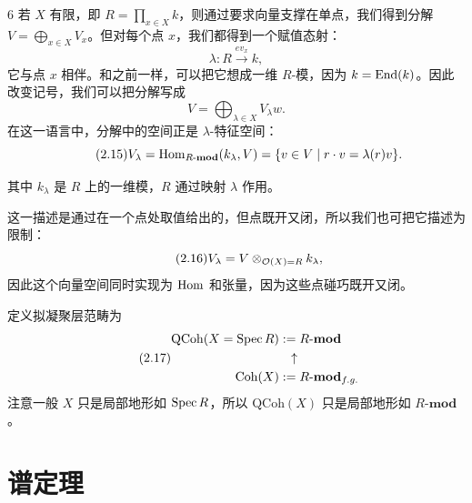 \begin{srcex}{6}
若 $X$ 有限，即 $R=\prod_{x\in X}k$，则通过要求向量支撑在单点，我们得到分解 $V=\bigoplus_{x\in X}V_x$。但对每个点 $x$，我们都得到一个赋值态射：
\begin{equation}\tag{2.13}
\lambda\colon R\xrightarrow{ev_x}k,
\end{equation}
它与点 $x$ 相伴。和之前一样，可以把它想成一维 $R$-模，因为 $k=\mathrm{End}(k)$。因此改变记号，我们可以把分解写成
\begin{equation}\tag{2.14}
V=\bigoplus_{\lambda\in X}V_\lambda w.
\end{equation}
在这一语言中，分解中的空间正是 $\lambda$-特征空间：
\begin{equation}\tag{2.15}
V_\lambda=\mathrm{Hom}_{R\text{-}\mathbf{mod}}(k_\lambda,V)
=\{v\in V\mid r\cdot v=\lambda(r)v\}.
\end{equation}
\end{srcex}

其中 $k_\lambda$ 是 $R$ 上的一维模，$R$ 通过映射 $\lambda$ 作用。

这一描述是通过在一个点处取值给出的，但点既开又闭，所以我们也可把它描述为限制：
\begin{equation}\tag{2.16}
V_\lambda=V\otimes_{\mathcal{O}(X)=R}k_\lambda,
\end{equation}
因此这个向量空间同时实现为 $\mathrm{Hom}$ 和张量，因为这些点碰巧既开又闭。

定义拟凝聚层范畴为
\begin{equation}\tag{2.17}
\begin{aligned}
\mathrm{QCoh}(X=\mathrm{Spec}\,R) &:= R\text{-}\mathbf{mod}\\
&\ \ \uparrow\\
\mathrm{Coh}(X) &:= R\text{-}\mathbf{mod}_{f.g.}
\end{aligned}
\end{equation}
注意一般 $X$ 只是局部地形如 $\mathrm{Spec}\,R$，所以 $\mathrm{QCoh}(X)$ 只是局部地形如 $R\text{-}\mathbf{mod}$。

\section{谱定理}

